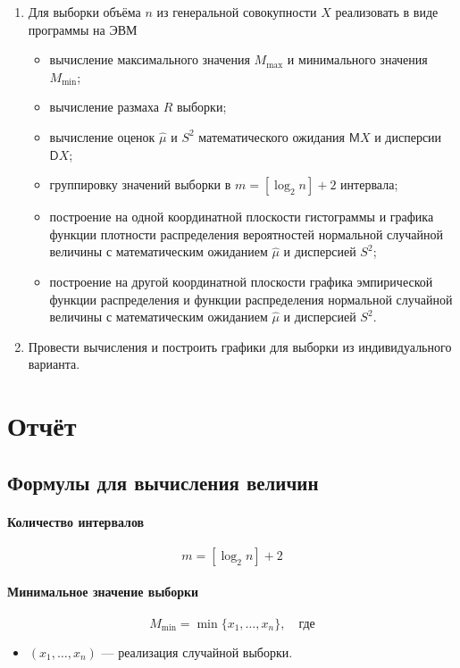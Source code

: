 \documentclass[a4paper, 12pt]{article}
\theoremstyle{definition}
\newcommand{\Expect}{%
	\mathsf{M}}
\renewcommand{\Variance}{%
	\mathsf{D}}
\begin{document}
\begin{enumerate}
	\item Для выборки объёма $n$ из генеральной совокупности $X$ реализовать в виде программы на ЭВМ
	\begin{itemize}
		\item вычисление максимального значения $M_{\max}$ и минимального значения $M_{\min}$;
		\item вычисление размаха $R$ выборки;
		\item вычисление оценок $\hat{\mu}$ и $S^2$ математического ожидания $\Expect X$ и дисперсии $\Variance X$;
		\item группировку значений выборки в $m = [\log_2 n] + 2$ интервала;
		\item построение на одной координатной плоскости гистограммы и графика функции плотности распределения вероятностей нормальной случайной величины с математическим ожиданием $\hat{\mu}$ и дисперсией $S^2$;
		\item построение на другой координатной плоскости графика эмпирической функции распределения и функции распределения нормальной случайной величины с математическим ожиданием $\hat{\mu}$ и дисперсией $S^2$.
	\end{itemize}
	\item Провести вычисления и построить графики для выборки из индивидуального варианта.
\end{enumerate}
\newpage
\section{Отчёт}

\subsection{Формулы для вычисления величин}

\paragraph{Количество интервалов}
\begin{equation}
m = [\log_2 n] + 2
\end{equation}


\paragraph{Минимальное значение выборки}

\begin{equation}
M_{\min} = \min \{ x_1, \dots, x_n\}, \quad \text{где}
\end{equation}
\begin{itemize}
	\item $(x_1, \dots, x_n)$ --- реализация случайной выборки.
\end{itemize}
\end{document}
